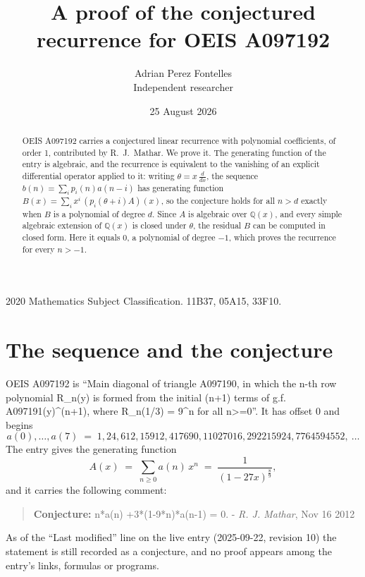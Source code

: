 \documentclass[11pt,a4paper]{article}
\title{A proof of the conjectured recurrence for OEIS A097192}
\author{Adrian Perez Fontelles\\ \small Independent researcher}
\date{25 August 2026}
\theoremstyle{plain}
\theoremstyle{definition}
\begin{document}
\maketitle

\begin{abstract}
OEIS A097192 carries a conjectured linear recurrence with polynomial coefficients, of
order 1, contributed by R.~J.~Mathar. We prove it. The generating function of the
entry is algebraic, and the recurrence is equivalent to the vanishing of an explicit
differential operator applied to it: writing $\theta=x\,\frac{d}{dx}$, the sequence
$b(n)=\sum_{i}p_{i}(n)a(n-i)$ has generating function
$B(x)=\sum_{i}x^{i}\,(p_{i}(\theta+i)A)(x)$, so the conjecture holds for all $n>d$ exactly
when $B$ is a polynomial of degree $d$. Since $A$ is algebraic over $\mathbb{Q}(x)$, and every simple
algebraic extension of $\mathbb{Q}(x)$ is closed under $\theta$, the residual $B$ can be
computed in closed form. Here it equals $0$, a polynomial of degree $-1$, which proves
the recurrence for every $n>-1$.
\end{abstract}

\noindent\small 2020 Mathematics Subject Classification. 11B37, 05A15, 33F10.\normalsize

\section{The sequence and the conjecture}

OEIS A097192 is ``Main diagonal of triangle A097190, in which the n-th row polynomial R\_n(y) is formed from the initial (n+1) terms of g.f. A097191(y)\textasciicircum{}(n+1), where R\_n(1/3) = 9\textasciicircum{}n for all n>=0''. It has offset $0$ and begins
\[
a(0),\dots,a(7)\;=\;1, 24, 612, 15912, 417690, 11027016, 292215924, 7764594552,\ \dots
\]
The entry gives the generating function
\begin{equation}\label{eq:gf}
A(x)\;=\;\sum_{n\ge 0} a(n)\,x^{n}\;=\;\frac{1}{\left(1 - 27 x\right)^{\frac{8}{9}}} ,
\end{equation}
and it carries the following comment:
\begin{quote}\small
\textbf{Conjecture:} n*a(n) +3*(1-9*n)*a(n-1) = 0. - \emph{R. J. Mathar}, Nov 16 2012
\end{quote}
As of the ``Last modified'' line on the live entry (2025-09-22, revision 10) the
statement is still recorded as a conjecture, and no proof appears among the entry's links,
formulas or programs.
\end{document}
